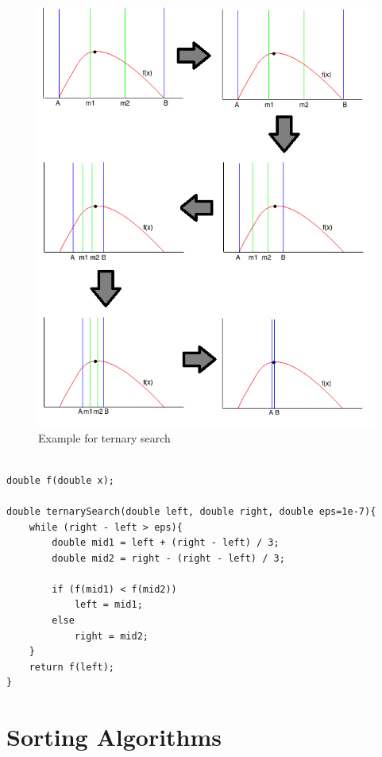 \documentclass[12pt]{article}
\begin{document}
\begin{figure}[h]
	\centering
	\includegraphics[width=1.0\linewidth]{ternary_search}
	\caption{Example for ternary search}
	\label{fig:ternary_search}
\end{figure}

\begin{verbatim}

double f(double x);

double ternarySearch(double left, double right, double eps=1e-7){
    while (right - left > eps){
        double mid1 = left + (right - left) / 3;
        double mid2 = right - (right - left) / 3;
        
        if (f(mid1) < f(mid2))
            left = mid1;
        else
            right = mid2;
    }
    return f(left);
}
\end{verbatim}

\cleardoublepage

	\section{Sorting Algorithms}
\end{document}
